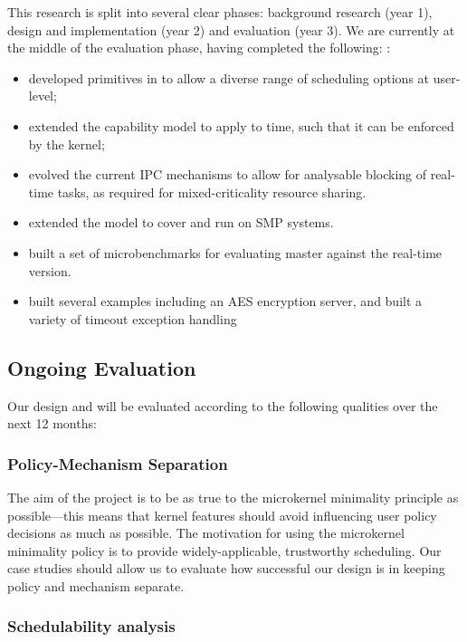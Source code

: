 This research is split into several clear phases: background research (year 1), design and implementation (year 2) and evaluation (year 3).
We are currently at the middle of the evaluation phase, having completed the following:
:
\begin{itemize}
	\item developed primitives in \selfour to allow a diverse range of scheduling options at user-level;
	\item extended the \selfour capability model to apply to time, such that it can be enforced by the kernel;
	\item evolved the current \selfour \gls{IPC} mechanisms to allow for analysable blocking of real-time tasks, as required for mixed-criticality resource sharing.
        \item extended the model to cover and run on \gls{SMP} systems.
        \item built a set of microbenchmarks for evaluating \selfour master against the real-time version.
        \item built several examples including an AES encryption server, and built a variety of timeout exception handling 
\end{itemize}

\subsection{Ongoing Evaluation}

Our design and will be evaluated according to the following qualities over the next 12 months:

\subsubsection{Policy-Mechanism Separation}

The aim of the project is to be as true to the microkernel minimality principle as possible---this means that kernel features should avoid influencing user policy decisions as much as possible.
The motivation for using the microkernel minimality policy is to provide widely-applicable, trustworthy scheduling.
Our case studies should allow us to evaluate how successful our design is in keeping policy and mechanism separate.

\subsubsection{Schedulability analysis}

